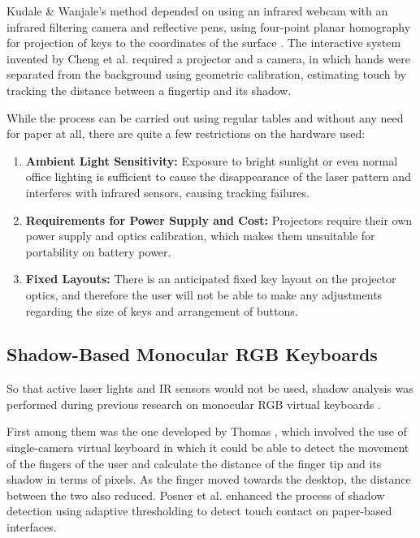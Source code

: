 Kudale \& Wanjale's method depended on using an infrared webcam with an infrared filtering camera and reflective pens, using four-point planar homography for projection of keys to the coordinates of the surface \cite{Kudale2016RealTime}. The interactive system invented by Cheng et al. \cite{Cheng2015Fingertip} required a projector and a camera, in which hands were separated from the background using geometric calibration, estimating touch by tracking the distance between a fingertip and its shadow.

While the process can be carried out using regular tables and without any need for paper at all, there are quite a few restrictions on the hardware used:
\begin{enumerate}
    \item \textbf{Ambient Light Sensitivity:} Exposure to bright sunlight or even normal office lighting is sufficient to cause the disappearance of the laser pattern and interferes with infrared sensors, causing tracking failures.
    \item \textbf{Requirements for Power Supply and Cost:} Projectors require their own power supply and optics calibration, which makes them unsuitable for portability on battery power.
    \item \textbf{Fixed Layouts:} There is an anticipated fixed key layout on the projector optics, and therefore the user will not be able to make any adjustments regarding the size of keys and arrangement of buttons.
\end{enumerate}

\subsection{Shadow-Based Monocular RGB Keyboards}
\label{subsec:lit_shadow_systems}
So that active laser lights and IR sensors would not be used, shadow analysis was performed during previous research on monocular RGB virtual keyboards \cite{Thomas2013Camera, Posner2012Single, Yue2014Blind}.

First among them was the one developed by Thomas \cite{Thomas2013Camera}, which involved the use of single-camera virtual keyboard in which it could be able to detect the movement of the fingers of the user and calculate the distance of the finger tip and its shadow in terms of pixels. As the finger moved towards the desktop, the distance between the two also reduced. Posner et al. \cite{Posner2012Single} enhanced the process of shadow detection using adaptive thresholding to detect touch contact on paper-based interfaces.

